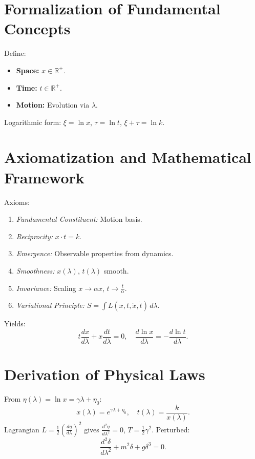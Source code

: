 \documentclass{article}
\begin{document}
\section{Formalization of Fundamental Concepts}
Define:
\begin{itemize}
    \item \textbf{Space:} \(x \in \mathbb{R}^+\).
    \item \textbf{Time:} \(t \in \mathbb{R}^+\).
    \item \textbf{Motion:} Evolution via \(\lambda\).
\end{itemize}
Logarithmic form: \(\xi = \ln x\), \(\tau = \ln t\), \(\xi + \tau = \ln k\).

\section{Axiomatization and Mathematical Framework}
Axioms:
\begin{enumerate}
    \item \emph{Fundamental Constituent:} Motion basis.
    \item \emph{Reciprocity:} \(x \cdot t = k\).
    \item \emph{Emergence:} Observable properties from dynamics.
    \item \emph{Smoothness:} \(x(\lambda)\), \(t(\lambda)\) smooth.
    \item \emph{Invariance:} Scaling \(x \to \alpha x\), \(t \to \frac{t}{\alpha}\).
    \item \emph{Variational Principle:} \(S = \int L(x,t,\dot{x},\dot{t})\,d\lambda\).
\end{enumerate}
Yields:
\[
t \frac{dx}{d\lambda} + x \frac{dt}{d\lambda} = 0, \quad \frac{d\ln x}{d\lambda} = -\frac{d\ln t}{d\lambda}.
\]

\section{Derivation of Physical Laws}
From \(\eta(\lambda) = \ln x = \gamma \lambda + \eta_0\):
\[
x(\lambda) = e^{\gamma \lambda + \eta_0}, \quad t(\lambda) = \frac{k}{x(\lambda)}.
\]
Lagrangian \(L = \frac{1}{2}\left(\frac{d\eta}{d\lambda}\right)^2\) gives \(\frac{d^2\eta}{d\lambda^2} = 0\), \(T = \frac{1}{2}\gamma^2\). Perturbed:
\[
\frac{d^2\delta}{d\lambda^2} + m^2 \delta + g \delta^3 = 0.
\]
\end{document}
